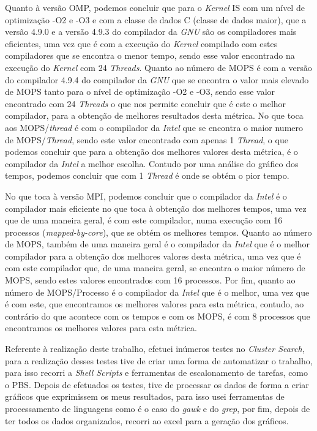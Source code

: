 \documentclass[conference,compsoc]{IEEEtran}
\begin{document}
Quanto à versão OMP, podemos concluir que para o \textit{Kernel} IS com um nível de optimização -O2 e -O3 e com a classe de dados C (classe de dados maior), que a versão 4.9.0 e a versão 4.9.3 do compilador da \textit{GNU} são os compiladores mais eficientes, uma vez que é com a execução do \textit{Kernel} compilado com estes compiladores que se encontra o menor tempo, sendo esse valor encontrado na execução do \textit{Kernel} com 24 \textit{Threads}. Quanto ao número de MOPS é com a versão do compilador 4.9.4 do compilador da \textit{GNU} que se encontra o valor mais elevado de MOPS tanto para o nível de optimização -O2 e -O3, sendo esse valor encontrado com 24 \textit{Threads} o que nos permite concluir que é este o melhor compilador, para a obtenção de melhores resultados desta métrica. No que toca aos MOPS/\textit{thread} é com o compilador da \textit{Intel} que se encontra o maior numero de MOPS/\textit{Thread}, sendo este valor encontrado com apenas 1 \textit{Thread}, o que podemos concluir que para a obtenção dos melhores valores desta métrica, é o compilador da \textit{Intel} a melhor escolha. Contudo por uma análise do gráfico dos tempos, podemos concluir que com 1 \textit{Thread} é onde se obtém o pior tempo.

No que toca à versão MPI, podemos concluir que o compilador da \textit{Intel} é o compilador mais eficiente no que toca à obtenção dos melhores tempos, uma vez que de uma maneira geral, é com este compilador, numa execução com 16 processos (\textit{mapped-by-core}), que se obtém os melhores tempos. Quanto ao número de MOPS, também de uma maneira geral é o compilador da \textit{Intel} que é o melhor compilador para a obtenção dos melhores valores desta métrica, uma vez que é com este compilador que, de uma maneira geral, se encontra o maior número de MOPS, sendo estes valores encontrados com 16 processos. Por fim, quanto ao número de MOPS/Processo é o compilador da \textit{Intel} que é o melhor, uma vez que é com este, que encontramos os melhores valores para esta métrica, contudo, ao contrário do que acontece com os tempos e com os MOPS, é com 8 processos que encontramos os melhores valores para esta métrica.

Referente à realização deste trabalho, efetuei inúmeros testes no \textit{Cluster Search}, para a realização desses testes tive de criar uma forma de automatizar o trabalho, para isso recorri a \textit{Shell Scripts} e ferramentas de escalonamento de tarefas, como o PBS. Depois de efetuados os testes, tive de processar os dados de forma a criar gráficos que exprimissem os meus resultados, para isso usei ferramentas de processamento de linguagens como é o caso do \textit{gawk} e do \textit{grep}, por fim, depois de ter todos os dados organizados, recorri ao excel para a geração dos gráficos. 
\end{document}
